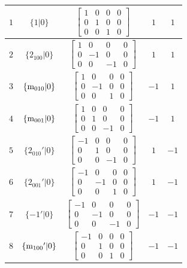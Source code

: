 \documentclass[fleqn,8pt]{jsarticle}
\begin{document}
\begin{longtable}{ccccc}
$ 1 $ & $ \{1|0\} $ & $ \begin{bmatrix} 1 & 0 & 0 & 0 \\ 0 & 1 & 0 & 0 \\ 0 & 0 & 1 & 0 \end{bmatrix} $ & $ 1 $ & $ 1 $ \\ \hline
$ 2 $ & $ \{2{}_{100}|0\} $ & $ \begin{bmatrix} 1 & 0 & 0 & 0 \\ 0 & -1 & 0 & 0 \\ 0 & 0 & -1 & 0 \end{bmatrix} $ & $ 1 $ & $ 1 $ \\ \hline
$ 3 $ & $ \{{\rm m}_{010}|0\} $ & $ \begin{bmatrix} 1 & 0 & 0 & 0 \\ 0 & -1 & 0 & 0 \\ 0 & 0 & 1 & 0 \end{bmatrix} $ & $ -1 $ & $ 1 $ \\ \hline
$ 4 $ & $ \{{\rm m}_{001}|0\} $ & $ \begin{bmatrix} 1 & 0 & 0 & 0 \\ 0 & 1 & 0 & 0 \\ 0 & 0 & -1 & 0 \end{bmatrix} $ & $ -1 $ & $ 1 $ \\ \hline
$ 5 $ & $ \{2{}_{010}{}'|0\} $ & $ \begin{bmatrix} -1 & 0 & 0 & 0 \\ 0 & 1 & 0 & 0 \\ 0 & 0 & -1 & 0 \end{bmatrix} $ & $ 1 $ & $ -1 $ \\ \hline
$ 6 $ & $ \{2{}_{001}{}'|0\} $ & $ \begin{bmatrix} -1 & 0 & 0 & 0 \\ 0 & -1 & 0 & 0 \\ 0 & 0 & 1 & 0 \end{bmatrix} $ & $ 1 $ & $ -1 $ \\ \hline
$ 7 $ & $ \{-1{}'|0\} $ & $ \begin{bmatrix} -1 & 0 & 0 & 0 \\ 0 & -1 & 0 & 0 \\ 0 & 0 & -1 & 0 \end{bmatrix} $ & $ -1 $ & $ -1 $ \\ \hline
$ 8 $ & $ \{{\rm m}_{100}{}'|0\} $ & $ \begin{bmatrix} -1 & 0 & 0 & 0 \\ 0 & 1 & 0 & 0 \\ 0 & 0 & 1 & 0 \end{bmatrix} $ & $ -1 $ & $ -1 $ \\ \hline

\end{longtable}
\end{document}
